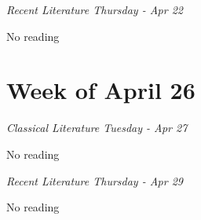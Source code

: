 \documentclass[12pt, notitlepage]{article}   	%
\begin{document}
{\textit{Recent Literature Thursday - Apr 22} \par
No reading \par

\section*{Week of April 26}
\textit{Classical Literature Tuesday - Apr 27} \par
No reading \par

\textit{Recent Literature Thursday - Apr 29} \par
No reading \par

} %
\end{document}
